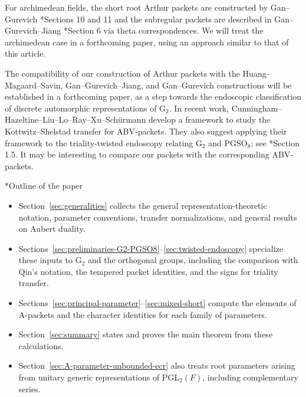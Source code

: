 \documentclass[12pt]{amsart}
\makeatletter
\renewcommand{\subsection}{\@startsection{subsection}{2}%
  \z@{.7\linespacing\@plus.5\linespacing}{.35\linespacing}%
  {\normalfont\bfseries\raggedright}}
\theoremstyle{definition}
\theoremstyle{plain}
\theoremstyle{remark}
\def\PGL{\mathrm{PGL}}
\def\PGSO{\mathrm{PGSO}}
\numberwithin{equation}{section}
\newcommand{\rG}{\mathrm{G}}
\makeatother
\begin{document}
For archimedean fields, the short root Arthur packets are constructed by Gan--Gurevich \cite{GanGurevich2006-NontemperedAPacketsG2}*{Sections 10 and 11} and the subregular packets are described in  Gan--Gurevich--Jiang \cite{GanGurevichJiang2002-CubicUnipotentArthurParameters}*{Section 6} via theta correspondences.
We will treat the archimedean case in a forthcoming paper, using an approach similar to that of this article.

The compatibility of our construction of Arthur packets with the Huang--Magaard--Savin, Gan--Gurevich--Jiang, and Gan--Gurevich constructions will be established in a forthcoming paper, as a step towards the endoscopic classification of discrete automorphic representations of $\rG_2$.
In recent work, Cunningham--Hazeltine--Liu--Lo--Ray--Xu--Sch\"urmann develop a framework to study the Kottwitz--Shelstad transfer for ABV-packets. 
They also suggest applying their framework to the triality-twisted endoscopy relating $\rG_2$ and $\PGSO_8$; see \cite{CunninghamEtAl2026-GeometrizationKottwitzShelstadTransfer}*{Section 1.5}.
It may be interesting to compare our packets with the corresponding ABV-packets.


\subsection*{Outline of the paper}
\begin{itemize}
      \item Section~\ref{sec:generalities} collects the general representation-theoretic notation, parameter conventions, transfer normalizations, and general results on Aubert duality. 
      \item Sections~\ref{sec:preliminaries-G2-PGSO8}--\ref{sec:twisted-endoscopy} specialize these inputs to
      $\rG_2$ and the orthogonal groups, including the comparison with Qin's notation, the tempered packet identities, and the signs for triality transfer. 
      \item Sections~\ref{sec:principal-parameter}--\ref{sec:mixed-short} compute the elements of A-packets and the character identities for each family of parameters.
      \item Section~\ref{sec:summary} states and proves the main theorem from these calculations. 
      \item  Section~\ref{sec:A-parameter-unbounded-ecr} also treats root parameters arising from unitary generic representations of $\PGL_2(F)$, including complementary series.
\end{itemize}
\end{document}
